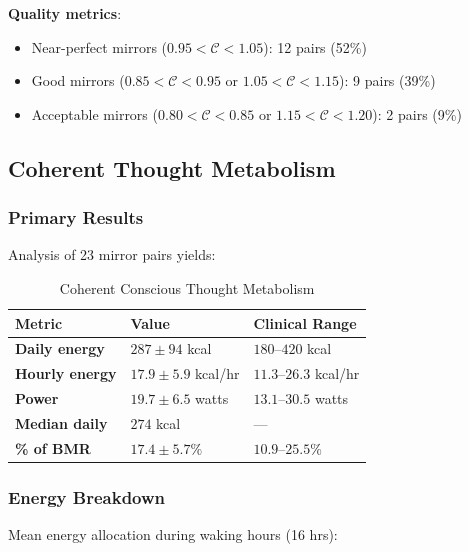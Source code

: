\documentclass[12pt,twocolumn]{article}
\theoremstyle{remark}
\begin{document}
\textbf{Quality metrics}:
\begin{itemize}
\item Near-perfect mirrors ($0.95 < \mathcal{C} < 1.05$): 12 pairs (52\%)
\item Good mirrors ($0.85 < \mathcal{C} < 0.95$ or $1.05 < \mathcal{C} < 1.15$): 9 pairs (39\%)
\item Acceptable mirrors ($0.80 < \mathcal{C} < 0.85$ or $1.15 < \mathcal{C} < 1.20$): 2 pairs (9\%)
\end{itemize}

\subsection{Coherent Thought Metabolism}

\subsubsection{Primary Results}

Analysis of 23 mirror pairs yields:

\begin{table}[H]
\centering
\caption{Coherent Conscious Thought Metabolism}
\begin{tabular}{@{}lll@{}}
\toprule
\textbf{Metric} & \textbf{Value} & \textbf{Clinical Range} \\
\midrule
\textbf{Daily energy} & $287 \pm 94$ kcal & $180$--$420$ kcal \\
\textbf{Hourly energy} & $17.9 \pm 5.9$ kcal/hr & $11.3$--$26.3$ kcal/hr \\
\textbf{Power} & $19.7 \pm 6.5$ watts & $13.1$--$30.5$ watts \\
\textbf{Median daily} & $274$ kcal & --- \\
\textbf{\% of BMR} & $17.4 \pm 5.7\%$ & $10.9$--$25.5\%$ \\
\bottomrule
\end{tabular}
\end{table}

\subsubsection{Energy Breakdown}

Mean energy allocation during waking hours (16 hrs):
\end{document}
